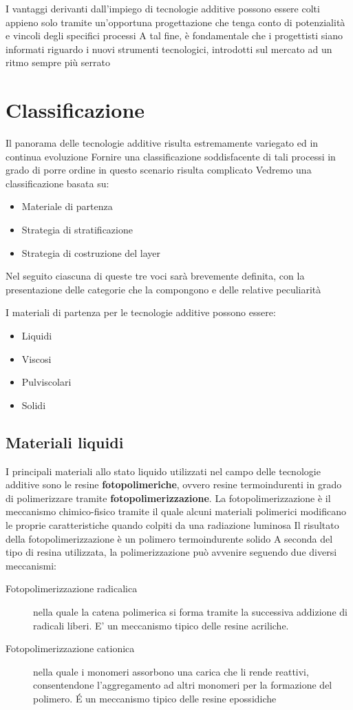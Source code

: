 I vantaggi derivanti dall'impiego di tecnologie additive possono essere colti appieno solo
tramite un'opportuna progettazione che tenga conto di potenzialità e vincoli degli specifici
processi
A tal fine, è fondamentale che i progettisti siano informati riguardo i nuovi strumenti
tecnologici, introdotti sul mercato ad un ritmo sempre più serrato

\section{Classificazione}
Il panorama delle tecnologie additive risulta estremamente variegato ed in continua
evoluzione
Fornire una classificazione soddisfacente di tali processi in grado di porre ordine in questo
scenario risulta complicato
Vedremo una classificazione basata su:
\begin{itemize}
\item Materiale di partenza
\item Strategia di stratificazione
\item Strategia di costruzione del layer
\end{itemize}

Nel seguito ciascuna di queste tre voci sarà brevemente definita, con la presentazione delle
categorie che la compongono e delle relative peculiarità

I materiali di partenza per le tecnologie additive possono essere:
\begin{itemize}
\item Liquidi
\item Viscosi
\item Pulviscolari
\item Solidi
\end{itemize}

\subsection{Materiali liquidi}
I principali materiali allo stato liquido utilizzati nel campo delle tecnologie additive sono le
resine \textbf{fotopolimeriche}, ovvero resine termoindurenti in grado di polimerizzare tramite \textbf{fotopolimerizzazione}.
La fotopolimerizzazione è il meccanismo chimico-fisico tramite il quale alcuni materiali
polimerici modificano le proprie caratteristiche quando colpiti da una radiazione luminosa
Il risultato della fotopolimerizzazione è un polimero termoindurente solido
A seconda del tipo di resina utilizzata, la polimerizzazione può avvenire seguendo due
diversi meccanismi:
\begin{description}
\item[Fotopolimerizzazione radicalica] nella quale la catena polimerica si forma tramite la
successiva addizione di radicali liberi. E' un meccanismo tipico delle resine acriliche.
\item[Fotopolimerizzazione cationica] nella quale i monomeri assorbono una carica che li rende
reattivi, consentendone l'aggregamento ad altri monomeri per la formazione del polimero. É
un meccanismo tipico delle resine epossidiche
\end{description}

